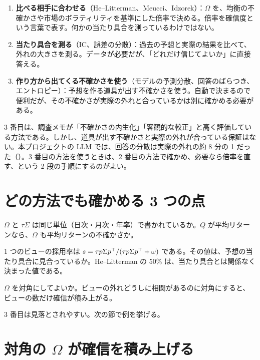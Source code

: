 \begin{enumerate}
\item \textbf{比べる相手に合わせる}（He--Litterman、Meucci、Idzorek）：$\Omega$ を、均衡の不確かさや市場のボラティリティを基準にした倍率で決める。倍率を確信度という言葉で表す。何かの当たり具合を測っているわけではない。
\item \textbf{当たり具合を測る}（IC、誤差の分散）：過去の予想と実際の結果を比べて、外れの大きさを測る。データが必要だが、「どれだけ信じてよいか」に直接答える。
\item \textbf{作り方から出てくる不確かさを使う}（モデルの予測分散、回答のばらつき、エントロピー）：予想を作る道具が出す不確かさを使う。自動で決まるので便利だが、その不確かさが実際の外れと合っているかは別に確かめる必要がある。
\end{enumerate}

3 番目は、調査メモが「不確かさの内生化」「客観的な較正」と高く評価している方法である。しかし、道具が出す不確かさと実際の外れが合っている保証はない。本プロジェクトの LLM では、回答の分散は実際の外れの約 8 分の 1 だった（）。3 番目の方法を使うときは、2 番目の方法で確かめ、必要なら倍率を直す、という 2 段の手順にするのがよい。

\section{どの方法でも確かめる 3 つの点}

\begin{description}[leftmargin=2em,style=nextline]
\item[1. 単位] $\Omega$ と $\tau\Sigma$ は同じ単位（日次・月次・年率）で書かれているか。$Q$ が平均リターンなら、$\Omega$ も平均リターンの不確かさか。
\item[2. 大きさの基準] 1 つのビューの採用率は $s=\tau p\Sigma p^{\top}/(\tau p\Sigma p^{\top}+\omega)$ である。その値は、予想の当たり具合に見合っているか。He--Litterman の 50\% は、当たり具合とは関係なく決まった値である。
\item[3. 相関] $\Omega$ を対角にしてよいか。ビューの外れどうしに相関があるのに対角にすると、ビューの数だけ確信が積み上がる。
\end{description}

3 番目は見落とされやすい。次の節で例を挙げる。

\section{対角の $\Omega$ が確信を積み上げる}\label{sec:diag-trap}

